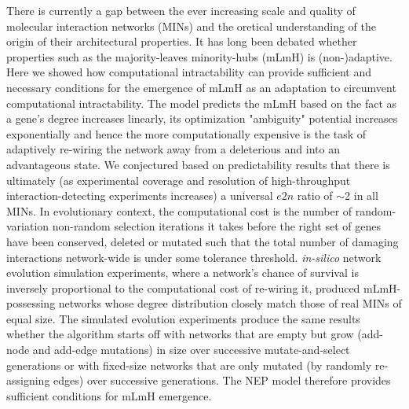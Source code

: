     There is currently  a gap between the ever increasing scale and quality of molecular interaction networks (MINs) and the oretical understanding of the origin of their architectural properties. It has long been debated whether properties such as the majority-leaves minority-hubs (mLmH) is (non-)adaptive. Here we showed how computational intractability can provide sufficient and necessary conditions for the emergence of mLmH as an adaptation to circumvent computational intractability. The model predicts the mLmH based on the fact as a gene's degree increases linearly, its optimization "ambiguity" potential increases exponentially and hence the more computationally expensive is the task of adaptively re-wiring the network away from a deleterious and into an advantageous state. We conjectured based on predictability results that there is ultimately (as experimental coverage and resolution of high-throughput interaction-detecting experiments increases) a universal $e2n$ ratio of ${\sim}$2 in all MINs. In evolutionary context, the computational cost is the number of random-variation non-random selection iterations it takes before the right set of genes have been conserved, deleted or mutated such that the total number of damaging interactions network-wide is under some tolerance threshold. \textit{in-silico} network evolution simulation experiments, where a network's chance of survival is inversely proportional to the computational cost of re-wiring it, produced mLmH-possessing networks whose degree distribution closely match those of real MINs of equal size. The simulated evolution experiments produce the same results whether the algorithm starts off with networks that are empty but grow (add-node and add-edge mutations) in size over successive  mutate-and-select generations or with fixed-size networks that are only mutated (by randomly re-assigning edges) over successive generations. The NEP model therefore provides sufficient conditions for mLmH emergence.


